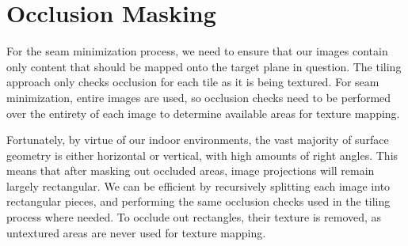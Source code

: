 \documentclass[10pt,twocolumn,letterpaper]{article}
\begin{document}
{\small   }

\appendix
\section{Occlusion Masking}
\label{sec:occlusionMasking}
For the seam minimization process, we need to ensure that our images contain only content
that should be mapped onto the target plane in question. The tiling
approach only checks occlusion for each tile as it is
being textured. For seam minimization, entire images are used, so occlusion checks need to be performed over the entirety of each image to
determine available areas for texture mapping.

Fortunately, by virtue of our indoor environments, the vast majority
of surface geometry is either horizontal or vertical, with high
amounts of right angles. This means that after masking out occluded
areas, image projections will remain largely rectangular. We can
be efficient by recursively splitting each image into rectangular
pieces, and performing the same occlusion checks used in the tiling
process where needed. To occlude out rectangles, their texture is removed, as untextured areas are
never used for texture mapping.
\end{document}
